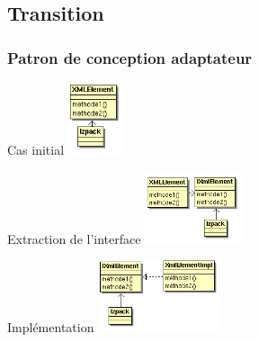\subsection{Transition}
\begin{frame}\frametitle{Patron de conception adaptateur}
\begin{minipage}[c]{.46\linewidth}
\begin{beamerboxesrounded}[shadow=true]{Cas initial}
	\centering
	\includegraphics[height=80px]{../image/sol_casInitialAlpha.png}
\end{beamerboxesrounded}
\end{minipage}
\hfill
\begin{minipage}[c]{.46\linewidth}
\begin{beamerboxesrounded}[shadow=true]{Extraction de l'interface}
	\centering
	\includegraphics[height=80px]{../image/sol_extractionInterfaceAlpha.png}
\end{beamerboxesrounded}
\end{minipage}
\vfill
\hfil
\begin{minipage}[c]{.80\linewidth}
\begin{beamerboxesrounded}[shadow=true]{Implémentation}
	\centering
	\includegraphics[height=80px]{../image/sol_implementationAlpha.png}
\end{beamerboxesrounded}
\end{minipage}
\end{frame}
